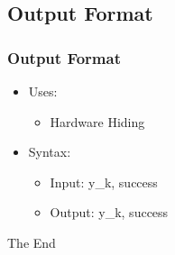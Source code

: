 \documentclass{beamer}
\begin{document}
\subsection {Output Format}

\begin{frame}
\frametitle{Output Format}
\begin{itemize}
\item Uses:
	\begin{itemize}
		\item Hardware Hiding
	\end{itemize}
\item Syntax:
	\begin{itemize}
		\item Input: y\_k, success
		\item Output: y\_k, success
	\end{itemize}
\end{itemize}
\end{frame}


\begin{frame}
\Huge{\centerline{The End}}
\end{frame}

\end{document}
